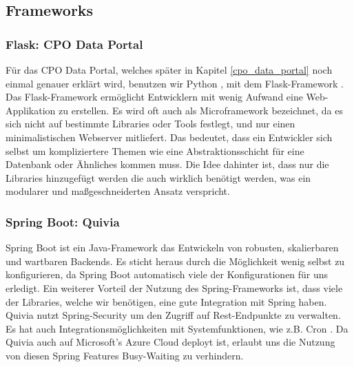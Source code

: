 \subsection{Frameworks}
\subsubsection{Flask: CPO Data Portal}
Für das CPO Data Portal, welches später in Kapitel \ref{cpo_data_portal} noch einmal genauer erklärt wird, benutzen wir Python \cite{Python}, mit dem Flask-Framework \cite{Flask}.
Das Flask-Framework ermöglicht Entwicklern mit wenig Aufwand eine Web-Applikation zu erstellen. Es wird oft auch als Microframework bezeichnet, da 
es sich nicht auf bestimmte Libraries oder Tools festlegt, und nur einen minimalistischen Webserver mitliefert. Das bedeutet, dass ein Entwickler
sich selbst um kompliziertere Themen wie eine Abstraktionsschicht für eine Datenbank oder Ähnliches kommen muss. Die Idee dahinter ist, dass nur
die Libraries hinzugefügt werden die auch wirklich benötigt werden, was ein modularer und maßgeschneiderten Ansatz verspricht.

\subsubsection{Spring Boot: Quivia}
Spring Boot \cite{SpringBoot} ist ein Java-Framework das Entwickeln von robusten, skalierbaren und wartbaren Backends. Es sticht heraus durch 
die Möglichkeit wenig selbst zu konfigurieren, da Spring Boot automatisch viele der Konfigurationen für uns erledigt. Ein weiterer Vorteil der 
Nutzung des Spring-Frameworks ist, dass viele der Libraries, welche wir benötigen, eine gute Integration mit Spring haben. Quivia nutzt 
Spring-Security um den Zugriff auf Rest-Endpunkte zu verwalten. Es hat auch Integrationsmöglichkeiten mit Systemfunktionen, wie z.B. 
Cron \cite{Cronjob}. Da Quivia auch auf Microsoft's Azure Cloud deployt ist, erlaubt uns die Nutzung von diesen Spring Features Busy-Waiting zu 
verhindern.
